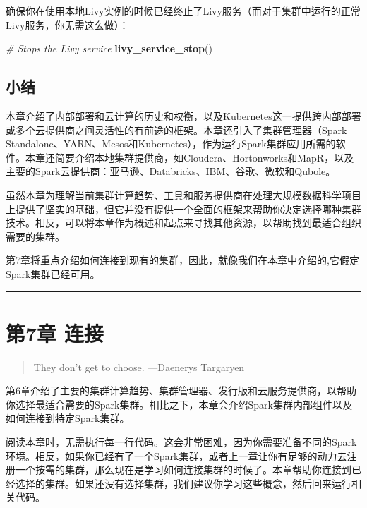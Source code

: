 \documentclass[
]{article}
\newenvironment{Shaded}{\begin{snugshade}}{\end{snugshade}}
\newcommand{\CommentTok}[1]{\textcolor[rgb]{0.56,0.35,0.01}{\textit{#1}}}
\newcommand{\KeywordTok}[1]{\textcolor[rgb]{0.13,0.29,0.53}{\textbf{#1}}}
\newcommand{\NormalTok}[1]{#1}
\begin{document}
确保你在使用本地Livy实例的时候已经终止了Livy服务（而对于集群中运行的正常Livy服务，你无需这么做）：

\begin{Shaded}
\begin{Highlighting}[]
\CommentTok{# Stops the Livy service}
\KeywordTok{livy_service_stop}\NormalTok{()}
\end{Highlighting}
\end{Shaded}

\hypertarget{ux5c0fux7ed3-4}{%
\subsection{小结}\label{ux5c0fux7ed3-4}}

本章介绍了内部部署和云计算的历史和权衡，以及Kubernetes这一提供跨内部部署或多个云提供商之间灵活性的有前途的框架。本章还引入了集群管理器（Spark
Standalone、YARN、Mesos和Kubernetes），作为运行Spark集群应用所需的软件。本章还简要介绍本地集群提供商，如Cloudera、Hortonworks和MapR，以及主要的Spark云提供商：亚马逊、Databricks、IBM、谷歌、微软和Qubole。

虽然本章为理解当前集群计算趋势、工具和服务提供商在处理大规模数据科学项目上提供了坚实的基础，但它并没有提供一个全面的框架来帮助你决定选择哪种集群技术。相反，可以将本章作为概述和起点来寻找其他资源，以帮助找到最适合组织需要的集群。

第7章将重点介绍如何连接到现有的集群，因此，就像我们在本章中介绍的,它假定Spark集群已经可用。

\begin{center}\rule{0.5\linewidth}{\linethickness}\end{center}

\hypertarget{ux7b2c7ux7ae0-ux8fdeux63a5}{%
\section{第7章 连接}\label{ux7b2c7ux7ae0-ux8fdeux63a5}}

\begin{quote}
They don't get to choose. ---Daenerys Targaryen
\end{quote}

第6章介绍了主要的集群计算趋势、集群管理器、发行版和云服务提供商，以帮助你选择最适合需要的Spark集群。相比之下，本章会介绍Spark集群内部组件以及如何连接到特定Spark集群。

阅读本章时，无需执行每一行代码。这会非常困难，因为你需要准备不同的Spark环境。相反，如果你已经有了一个Spark集群，或者上一章让你有足够的动力去注册一个按需的集群，那么现在是学习如何连接集群的时候了。本章帮助你连接到已经选择的集群。如果还没有选择集群，我们建议你学习这些概念，然后回来运行相关代码。
\end{document}
